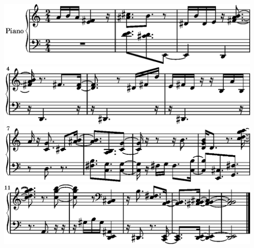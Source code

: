 \includegraphics{./bwv4/b6/lily-c0d0bd06-1}%
\ifx\betweenLilyPondSystem \undefined
  \linebreak
\else
  \expandafter{}%
\fi
\includegraphics{./bwv4/b6/lily-c0d0bd06-2}%
\ifx\betweenLilyPondSystem \undefined
  \linebreak
\else
  \expandafter{}%
\fi
\includegraphics{./bwv4/b6/lily-c0d0bd06-3}%
\ifx\betweenLilyPondSystem \undefined
  \linebreak
\else
  \expandafter{}%
\fi
\includegraphics{./bwv4/b6/lily-c0d0bd06-4}%
